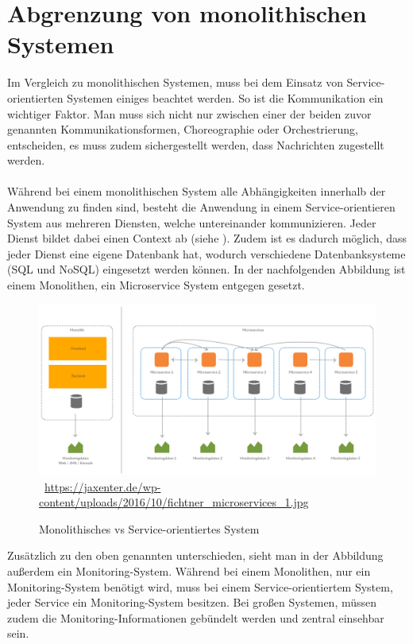 \section{Abgrenzung von monolithischen Systemen}
\label{sec:AbgrenzungVonMonolithischenSystemen}
Im Vergleich zu monolithischen Systemen, muss bei dem Einsatz von Service-orientierten Systemen einiges beachtet werden. So ist die Kommunikation ein wichtiger Faktor. Man muss sich nicht nur zwischen einer der beiden zuvor genannten Kommunikationsformen, Choreographie oder Orchestrierung, entscheiden, es muss zudem sichergestellt werden, dass Nachrichten zugestellt werden.
\\\\
Während bei einem monolithischen System alle Abhängigkeiten innerhalb der Anwendung zu finden sind, besteht die Anwendung in einem Service-orientieren System aus mehreren Diensten, welche untereinander kommunizieren. Jeder Dienst bildet dabei einen Context ab (siehe ). Zudem ist es dadurch möglich, dass jeder Dienst eine eigene Datenbank hat, wodurch verschiedene Datenbanksysteme (SQL und NoSQL) eingesetzt werden können. In der nachfolgenden Abbildung ist einem Monolithen, ein Microservice System entgegen gesetzt.
\begin{figure}[htb]
    \centering 
    \includegraphics[width=\linewidth]{content/images/fichtner_microservices_1}\
    \quelle\url{https://jaxenter.de/wp-content/uploads/2016/10/fichtner_microservices_1.jpg}
    \caption{Monolithisches vs Service-orientiertes System}
    \label{fig:BoundedContext}  
\end{figure}
Zusätzlich zu den oben genannten unterschieden, sieht man in der Abbildung außerdem ein Monitoring-System. Während bei einem Monolithen, nur ein Monitoring-System benötigt wird, muss bei einem Service-orientiertem System, jeder Service ein Monitoring-System besitzen. Bei großen Systemen, müssen zudem die Monitoring-Informationen gebündelt werden und zentral einsehbar sein.